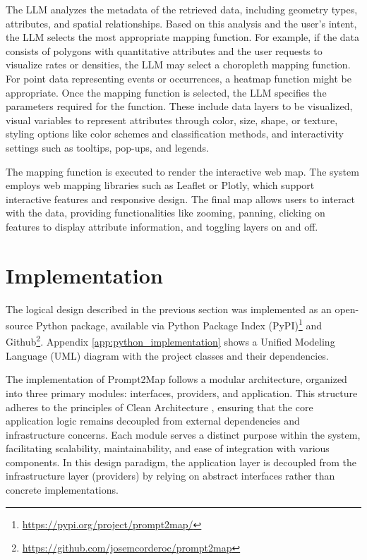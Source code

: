 The LLM analyzes the metadata of the retrieved data, including geometry types, attributes, and spatial relationships. Based on this analysis and the user's intent, the LLM selects the most appropriate mapping function. For example, if the data consists of polygons with quantitative attributes and the user requests to visualize rates or densities, the LLM may select a choropleth mapping function. For point data representing events or occurrences, a heatmap function might be appropriate. Once the mapping function is selected, the LLM specifies the parameters required for the function. These include data layers to be visualized, visual variables to represent attributes through color, size, shape, or texture, styling options like color schemes and classification methods, and interactivity settings such as tooltips, pop-ups, and legends.

The mapping function is executed to render the interactive web map. The system employs web mapping libraries such as Leaflet or Plotly, which support interactive features and responsive design. The final map allows users to interact with the data, providing functionalities like zooming, panning, clicking on features to display attribute information, and toggling layers on and off.

\section{Implementation}

The logical design described in the previous section was implemented as an open-source Python package, available via Python Package Index (PyPI)\footnote{\url{https://pypi.org/project/prompt2map/}} and  Github\footnote{\url{https://github.com/josemcorderoc/prompt2map}}. Appendix \ref{app:python_implementation} shows a Unified Modeling Language (UML) diagram with the project classes and their dependencies.

The implementation of Prompt2Map follows a modular architecture, organized into three primary modules: interfaces, providers, and application. This structure adheres to the principles of Clean Architecture \cite{10.5555/3175742}, ensuring that the core application logic remains decoupled from external dependencies and infrastructure concerns. Each module serves a distinct purpose within the system, facilitating scalability, maintainability, and ease of integration with various components. In this design paradigm, the application layer is decoupled from the infrastructure layer (providers) by relying on abstract interfaces rather than concrete implementations. 

